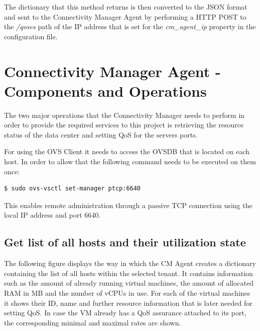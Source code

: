 The dictionary that this method returns is then converted to the JSON format and sent to the Connectivity Manager Agent by performing a HTTP POST to the \textit{/qoses} path of the IP address that is set for the \textit{cm\_agent\_ip} property in the configuration file.

\section{Connectivity Manager Agent - Components and Operations}

The two major operations that the Connectivity Manager needs to perform in order to provide the required services to this project is retrieving the resource status of the data center and setting QoS for the servers ports.

For using the OVS Client it needs to access the OVSDB that is located on each host. In order to allow that the following command needs to be executed on them once:
\begin{lstlisting}[language=commands]
$ sudo ovs-vsctl set-manager ptcp:6640
\end{lstlisting}

This enables remote administration through a passive TCP connection using the local IP address and port 6640. 

\subsection{Get list of all hosts and their utilization state}

The following figure displays the way in which the CM Agent creates a dictionary containing the list of all hosts within the selected tenant. It contains information such as the amount of already running virtual machines, the amount of allocated RAM in MB and the number of vCPUs in use. For each of the virtual machines it shows their ID, name and further resource information that is later needed for setting QoS. In case the VM already has a QoS assurance attached to its port, the corresponding minimal and maximal rates are shown.

